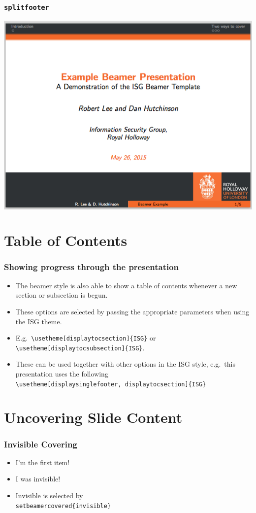 \documentclass[]{beamer}
\begin{document}
\begin{frame}\frametitle{\texttt{splitfooter}}
\begin{center}
	\includegraphics[scale=0.4]{graphics/splitfooter.png}
\end{center}
\end{frame}

\section{Table of Contents}
\begin{frame}\frametitle{Showing progress through the presentation}
\begin{itemize}
	\item The beamer style is also able to show a table of contents whenever a new section or subsection is begun.
	\item These options are selected by passing the appropriate parameters when using the ISG theme.
	\item E.g.\ \texttt{\textbackslash usetheme[displaytocsection]\{ISG\}} or \texttt{\textbackslash usetheme[displaytocsubsection]\{ISG\}}.
	\item These can be used together with other options in the ISG style, e.g.\ this presentation uses the following\\ {\scriptsize\texttt{\textbackslash usetheme[displaysinglefooter, displaytocsection]\{ISG\}}}
\end{itemize}
\end{frame}

\section{Uncovering Slide Content}
\begin{frame}\frametitle{Invisible Covering}
\begin{itemize}
	\item I'm the first item!
	\pause
	\item I was invisible!
	\pause
	\item Invisible is selected by \texttt{\\setbeamercovered\{invisible\}}
\end{itemize}
\end{frame}
\end{document}
